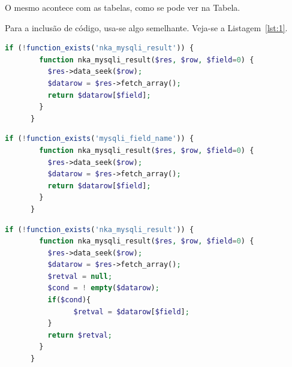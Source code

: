 O mesmo acontece com as tabelas, como se pode ver na Tabela.


Para a inclusão de código, usa-se algo semelhante. Veja-se a Listagem~\ref{lst:1}.\newpage

\begin{lstlisting}[language={php},
                   caption={Função para substituir mysql\_result.},
                   label=lst:1]
      if (!function_exists('nka_mysqli_result')) {
      	function nka_mysqli_result($res, $row, $field=0) {
      	  $res->data_seek($row);
      	  $datarow = $res->fetch_array();
      	  return $datarow[$field];
      	}
      }
\end{lstlisting}

\begin{lstlisting}[language={php},
                   caption={Função para substituir mysql\_field\_name.},
                   label=lst:2]
      if (!function_exists('mysqli_field_name')) {
      	function nka_mysqli_result($res, $row, $field=0) {
      	  $res->data_seek($row);
      	  $datarow = $res->fetch_array();
      	  return $datarow[$field];
      	}
      }
\end{lstlisting}

\begin{lstlisting}[language={php},
                   caption={Improvement da função nka\_mysql\_result.},
                   label=lst:3]
      if (!function_exists('nka_mysqli_result')) {
        function nka_mysqli_result($res, $row, $field=0) {
      	  $res->data_seek($row);
      	  $datarow = $res->fetch_array();
      	  $retval = null;
      	  $cond = ! empty($datarow);
      	  if($cond){
      		    $retval = $datarow[$field];
      	  }
      	  return $retval;
      	}
      }
\end{lstlisting}
